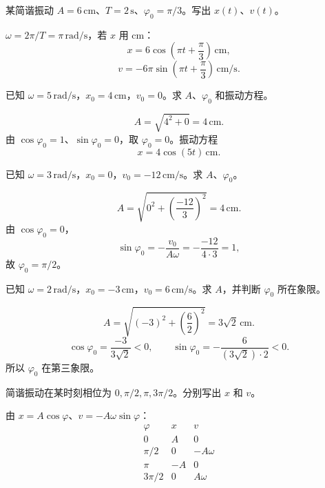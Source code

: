 \begin{exercise}[level=basic]
某简谐振动 $A=6\,\mathrm{cm}$、$T=2\,\mathrm{s}$、$\varphi_0=\pi/3$。写出 $x(t)$、$v(t)$。
\begin{solution}
$\omega=2\pi/T=\pi\,\mathrm{rad/s}$，若 $x$ 用 $\mathrm{cm}$：
\[
  x=6\cos\left(\pi t+\frac{\pi}{3}\right)\,\mathrm{cm},
\]
\[
  v=-6\pi\sin\left(\pi t+\frac{\pi}{3}\right)\,\mathrm{cm/s}.
\]
\end{solution}
\end{exercise}

\begin{exercise}[level=standard]
已知 $\omega=5\,\mathrm{rad/s}$，$x_0=4\,\mathrm{cm}$，$v_0=0$。求 $A$、$\varphi_0$ 和振动方程。
\begin{solution}
\[
  A=\sqrt{4^2+0}=4\,\mathrm{cm}.
\]
由 $\cos\varphi_0=1$、$\sin\varphi_0=0$，取 $\varphi_0=0$。振动方程
\[
  x=4\cos(5t)\,\mathrm{cm}.
\]
\end{solution}
\end{exercise}

\begin{exercise}[level=standard]
已知 $\omega=3\,\mathrm{rad/s}$，$x_0=0$，$v_0=-12\,\mathrm{cm/s}$。求 $A$、$\varphi_0$。
\begin{solution}
\[
  A=\sqrt{0^2+\left(\frac{-12}{3}\right)^2}=4\,\mathrm{cm}.
\]
由 $\cos\varphi_0=0$，
\[
  \sin\varphi_0=-\frac{v_0}{A\omega}
  =-\frac{-12}{4\cdot3}=1,
\]
故 $\varphi_0=\pi/2$。
\end{solution}
\end{exercise}

\begin{exercise}[level=standard]
已知 $\omega=2\,\mathrm{rad/s}$，$x_0=-3\,\mathrm{cm}$，$v_0=6\,\mathrm{cm/s}$。求 $A$，并判断 $\varphi_0$ 所在象限。
\begin{solution}
\[
  A=\sqrt{(-3)^2+\left(\frac{6}{2}\right)^2}=3\sqrt2\,\mathrm{cm}.
\]
\[
  \cos\varphi_0=\frac{-3}{3\sqrt2}<0,\qquad
  \sin\varphi_0=-\frac{6}{(3\sqrt2)\cdot2}<0.
\]
所以 $\varphi_0$ 在第三象限。
\end{solution}
\end{exercise}

\begin{exercise}[level=standard]
简谐振动在某时刻相位为 $0,\pi/2,\pi,3\pi/2$。分别写出 $x$ 和 $v$。
\begin{solution}
由 $x=A\cos\varphi$、$v=-A\omega\sin\varphi$：
\[
\begin{array}{c|c|c}
\varphi & x & v\\
\hline
0&A&0\\
\pi/2&0&-A\omega\\
\pi&-A&0\\
3\pi/2&0&A\omega
\end{array}
\]
\end{solution}
\end{exercise}

